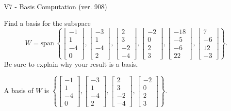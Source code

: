 \begin{exercise}
  \begin{exerciseTitle}V7 - Basis Computation (ver. 908)\end{exerciseTitle}
  \begin{exerciseStatement}
    Find a basis for the subspace 
\[W=\mathrm{span}\ \left\{\left[\begin{array}{r}
-1 \\
1 \\
-4 \\
0
\end{array}\right] , \left[\begin{array}{r}
-3 \\
1 \\
-4 \\
2
\end{array}\right] , \left[\begin{array}{r}
2 \\
3 \\
-2 \\
-4
\end{array}\right] , \left[\begin{array}{r}
-2 \\
0 \\
2 \\
3
\end{array}\right] , \left[\begin{array}{r}
-18 \\
-5 \\
-6 \\
22
\end{array}\right] , \left[\begin{array}{r}
7 \\
-6 \\
12 \\
-3
\end{array}\right]\right\}.\]
 Be sure to explain why your result is a basis.


  \end{exerciseStatement}
  \begin{exerciseAnswer}
   A basis of \(W\) is  \(\left\{\left[\begin{array}{r}
-1 \\
1 \\
-4 \\
0
\end{array}\right] , \left[\begin{array}{r}
-3 \\
1 \\
-4 \\
2
\end{array}\right] , \left[\begin{array}{r}
2 \\
3 \\
-2 \\
-4
\end{array}\right] , \left[\begin{array}{r}
-2 \\
0 \\
2 \\
3
\end{array}\right]\right\}\).
  


  \end{exerciseAnswer}
\end{exercise}